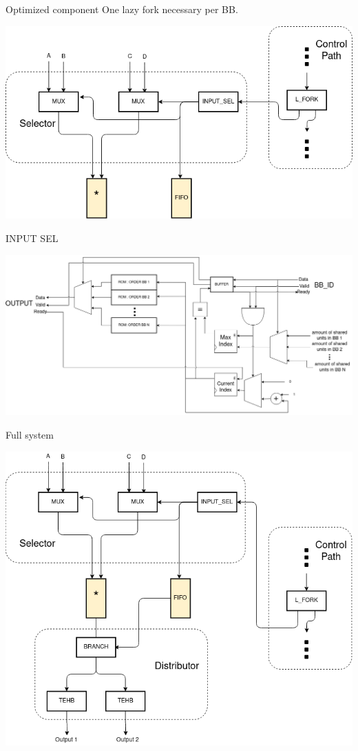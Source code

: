 \documentclass{beamer}
\begin{document}
\begin{frame}{Optimized component}
One lazy fork necessary per BB.
\begin{center}
\includegraphics[scale=0.35]{opti_selector.png}
\end{center}
\end{frame}

\begin{frame}{INPUT SEL}
\begin{center}
\includegraphics[scale=0.27]{SEL_INPUT.png}
\end{center}
\end{frame}

\begin{frame}{Full system}
\begin{center}
\includegraphics[scale=0.3]{full_example.png}
\end{center}
\end{frame}
\end{document}

